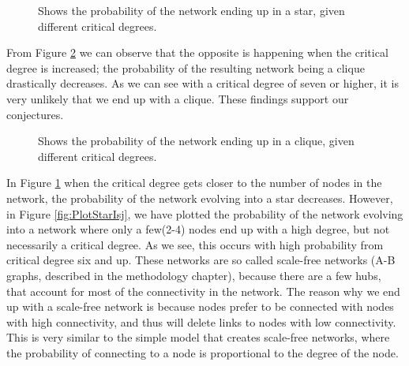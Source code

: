 \begin{figure}
\centering
{}
\caption{\label{fig:PlotStar} Shows the probability of the network ending up in a star, given different critical degrees.}
\end{figure}

From Figure \ref{fig:PlotClique} we can observe that the opposite is happening when the critical degree is increased; the probability of the resulting network being a clique drastically decreases. As we can see with a critical degree of seven or higher, it is very unlikely that we end up with a clique. These findings support our conjectures.

\begin{figure}
\centering
{}
\caption{\label{fig:PlotClique} Shows the probability of the network ending up in a clique, given different critical degrees.}
\end{figure}

In Figure \ref{fig:PlotStar} when the critical degree gets closer to the number of nodes in the network, the probability of the network evolving into a star decreases. However, in Figure \ref{fig:PlotStarIsj}, we have plotted the probability of the network evolving into a network where only a few(2-4) nodes end up with a high degree, but not necessarily a critical degree. As we see, this occurs with high probability from critical degree six and up. These networks are so called scale-free networks (A-B graphs, described in the methodology chapter), because there are a few hubs, that account for most of the connectivity in the network. The reason why we end up with a scale-free network is because nodes prefer to be connected with nodes with high connectivity, and thus will delete links to nodes with low connectivity. This is very similar to the simple model that creates scale-free networks, where the probability of connecting to a node is proportional to the degree of the node.

